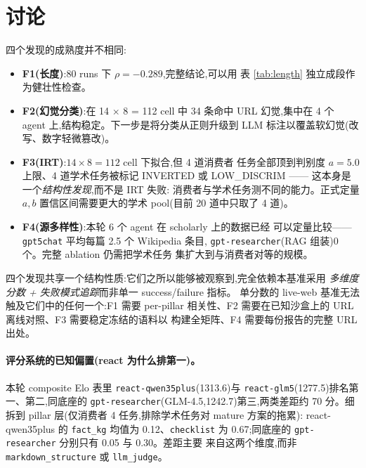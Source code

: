 \documentclass[UTF8,11pt]{ctexart}
\begin{document}
\section{讨论}

四个发现的成熟度并不相同:
\begin{itemize}[leftmargin=2em,itemsep=2pt,labelsep=0.5em]
  \item \textbf{F1(长度)}:80 runs 下 $\rho = -0.289$,完整结论,可以用
    表 \ref{tab:length} 独立成段作为健壮性检查。
  \item \textbf{F2(幻觉分类)}:在 14 $\times$ 8 = 112 cell 中 34 条命中
    URL 幻觉,集中在 4 个 agent 上,结构稳定。下一步是将分类从正则升级到
    LLM 标注以覆盖软幻觉(改写、数字轻微篡改)。
  \item \textbf{F3(IRT)}:$14 \times 8 = 112$ cell 下拟合,但 4 道消费者
    任务全部顶到判别度 $a = 5.0$ 上限、4 道学术任务被标记 INVERTED 或
    LOW\_DISCRIM —— 这本身是一个\emph{结构性发现},而不是 IRT 失败:
    消费者与学术任务测不同的能力。正式定量 $a, b$ 置信区间需要更大的学术
    pool(目前 20 道中只取了 4 道)。
  \item \textbf{F4(源多样性)}:本轮 6 个 agent 在 scholarly 上的数据已经
    可以定量比较——\texttt{gpt5chat} 平均每篇 2.5 个 Wikipedia 条目,
    \texttt{gpt-researcher}(RAG 组装)0 个。完整 ablation 仍需把学术任务
    集扩大到与消费者对等的规模。
\end{itemize}

四个发现共享一个结构性质:它们之所以能够被观察到,完全依赖本基准采用
\textit{多维度分数 + 失败模式追踪}而非单一 success/failure 指标。
单分数的 live-web 基准无法触及它们中的任何一个:F1 需要 per-pillar
相关性、F2 需要在已知沙盒上的 URL 离线对照、F3 需要稳定冻结的语料以
构建全矩阵、F4 需要每份报告的完整 URL 出处。

\paragraph{评分系统的已知偏置(react 为什么排第一)。}
本轮 composite Elo 表里 \texttt{react-qwen35plus}(1313.6)与
\texttt{react-glm5}(1277.5)排名第一、第二,同底座的
\texttt{gpt-researcher}(GLM-4.5,1242.7)第三,两类差距约 70 分。细拆到
pillar 层(仅消费者 4 任务,排除学术任务对 mature 方案的拖累):
react-qwen35plus 的 \texttt{fact\_kg} 均值为 0.12、\texttt{checklist}
为 0.67;同底座的 \texttt{gpt-researcher} 分别只有 0.05 与 0.30。差距主要
来自这两个维度,而非 \texttt{markdown\_structure} 或 \texttt{llm\_judge}。
\end{document}
